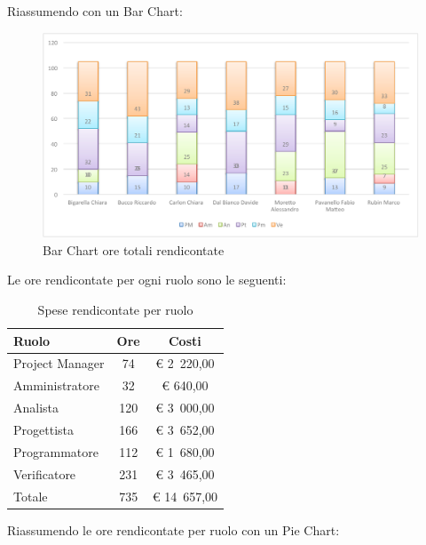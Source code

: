 			Riassumendo con un Bar Chart:
			\begin{figure}[H]\centering
				\includegraphics[width=\textwidth]{PianoDiProgetto/Pics/ChartOreRendic.pdf}
				\caption{Bar Chart ore totali rendicontate}
			\end{figure}
			Le ore rendicontate per ogni ruolo sono le seguenti:
			\begin{table}[H]
				\begin{center}
					\begin{tabular}{| l | c | c |}
						\hline
						Ruolo 			& Ore 		& Costi  \\ \hline
						
						Project Manager	& 74 			& \euro{} 2~220,00 	\\
						Amministratore 		& 32 			& \euro{} 640,00 	\\
						Analista	 		& 120 		& \euro{} 3~000,00 	\\
						Progettista 		& 166 		& \euro{} 3~652,00  	\\
						Programmatore		& 112 		& \euro{} 1~680,00 	\\
						Verificatore		& 231 		& \euro{} 3~465,00 	\\ \hline \hline
						
						Totale	 		& 735 		& \euro{} 14~657,00 	\\ \hline
					\end{tabular}
				\end{center}
				\caption{Spese rendicontate per ruolo}
			\end{table}
			Riassumendo le ore rendicontate per ruolo con un Pie Chart:
